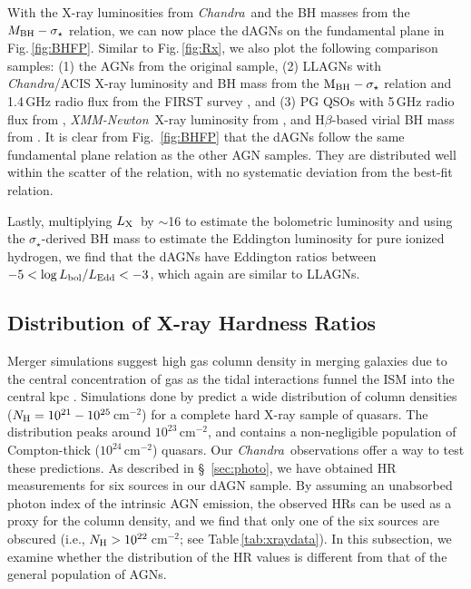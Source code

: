 \documentclass[iop,revtex4,twocolumn,apj,numberedappendix,appendixfloats]{emulateapj}
\newcommand{\lx}{$L_{\rm X}$}
\newcommand{\chandra}{{\it Chandra}}
\newcommand{\xmm}{{\it XMM-Newton}}
\begin{document}
With the X-ray luminosities from \chandra\ and the BH masses from the $M_{\rm BH}-\sigma_\star$ relation, we can now place the dAGNs on the fundamental plane in Fig.\,\ref{fig:BHFP}. Similar to Fig.\,\ref{fig:Rx}, we also plot the following comparison samples: (1) the AGNs from the original \citet{Merloni03} sample, (2) LLAGNs with \chandra/ACIS X-ray luminosity and BH mass from the $\rm M_{\rm BH}-\sigma_\star$ relation \citep{She17} and 1.4\,GHz radio flux from the FIRST survey \citep{Helfand15}, and (3) PG QSOs with 5\,GHz radio flux from \citet{Kellermann89}, \xmm\ X-ray luminosity from \citet{Piconcelli05}, and H$\beta$-based virial BH mass from \citet{Lani17}. It is clear from Fig.~\ref{fig:BHFP} that the dAGNs follow the same fundamental plane relation as the other AGN samples. They are distributed well within the scatter of the relation, with no systematic deviation from the best-fit relation. 

Lastly, multiplying \lx\ by $\sim$16 to estimate the bolometric luminosity \citep{Ho08} and using the $\sigma_\star$-derived BH mass to estimate the Eddington luminosity for pure ionized hydrogen, we find that the dAGNs have Eddington ratios between $-5 < \log L_{\rm bol}/L_{\rm Edd} < -3$, which again are similar to LLAGNs.

\subsection{Distribution of X-ray Hardness Ratios} \label{sec:HR}

Merger simulations suggest high gas column density in merging galaxies due to the central concentration of gas as the tidal interactions funnel the ISM into the central kpc \citep{Hernquist89}. Simulations done by \citet{Hopkins06b} predict a wide distribution of column densities ($N_{\rm H} = 10^{21} - 10^{25}$\,cm$^{-2}$) for a complete hard X-ray sample of quasars. The distribution peaks around $10^{23}$\,cm$^{-2}$, and contains a non-negligible population of Compton-thick ($10^{24}$\,cm$^{-2}$) quasars. Our \chandra\ observations offer a way to test these predictions. 
As described in \S~\ref{sec:photo}, we have obtained HR measurements for six sources in our dAGN sample. By assuming an unabsorbed photon index of the intrinsic AGN emission, the observed HRs can be used as a proxy for the column density, and we find that only one of the six sources are obscured (i.e., $N_{\rm H} > 10^{22}$\,cm$^{-2}$; see Table\,\ref{tab:xraydata}). In this subsection, we examine whether the distribution of the HR values is different from that of the general population of AGNs. 
\end{document}
